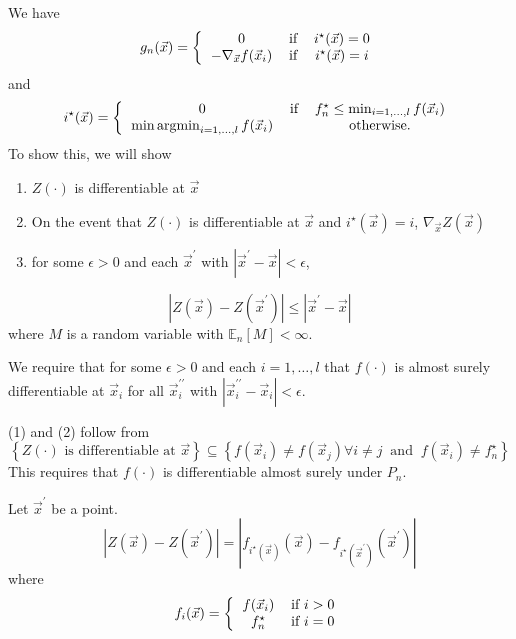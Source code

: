 \documentclass[phd,tocprelim]{cornell}
\DeclareMathOperator*{\argmin}{argmin}
\begin{document}
We have
\begin{equation}
    g_{n}(\vec{x}) = \left\{ \begin{tabular}{ccc}
        0 & if & $i^{\star}(\vec{x}) = 0$ \\
        $-\nabla_{\vec{x}} f(\vec{x}_{i})$ & if & $i^{\star}(\vec{x}) = i$
    \end{tabular} \right.
\end{equation}
and
\begin{equation}
    i^{\star}(\vec{x}) = \left\{ \begin{tabular}{ccc}
        0 & if & $f_{n}^{\star} \leq \min_{i=1,\ldots,l} f(\vec{x}_{i})$ \\
        $\min \argmin_{i=1,\ldots,l} f(\vec{x}_{i})$ & & otherwise.
    \end{tabular} \right.
\end{equation}
To show this, we will show
\begin{enumerate}
    \item $Z(\cdot)$ is differentiable at $\vec{x}$
    \item On the event that $Z(\cdot)$ is differentiable at $\vec{x}$ and $i^{\star}(\vec{x}) = i$, $\nabla_{\vec{x}} Z(\vec{x})$
    \item for some $\epsilon > 0$ and each $\vec{x}^{\prime}$ with $|\vec{x}^{\prime} - \vec{x}| < \epsilon$,
\end{enumerate}
\begin{equation}
    \left|Z(\vec{x}) - Z(\vec{x}^{\prime})\right| \leq \left|\vec{x}^{\prime} - \vec{x}\right|
\end{equation}
where $M$ is a random variable with $\mathbb{E}_{n}\left[M\right] < \infty$.

We require that for some $\epsilon > 0$ and each $i = 1, \ldots, l$ that $f(\cdot)$ is almost surely differentiable at $\vec{x}_{i}$ for all $\vec{x}_{i}^{\prime\prime}$ with $|\vec{x}_{i}^{\prime\prime} - \vec{x}_{i}| < \epsilon$.

(1) and (2) follow from
\begin{equation}
    \left\{Z(\cdot) \text{ is differentiable at } \vec{x}\right\} \subseteq \left\{f(\vec{x}_{i}) \neq f(\vec{x}_{j}) \forall i \neq j \ \text{ and } \ f(\vec{x}_{i}) \neq f_{n}^{\star} \right\}
\end{equation}
This requires that $f(\cdot)$ is differentiable almost surely under $P_{n}$.

Let $\vec{x}^{\prime}$ be a point.
\begin{equation}
    \left|Z(\vec{x}) - Z(\vec{x}^{\prime})\right| = \left|f_{i^{\star}(\vec{x})}(\vec{x}) - f_{i^{\star}(\vec{x}^{\prime})}(\vec{x}^{\prime})\right|
    \label{ZZ}
\end{equation}
where
\begin{equation}
    f_{i}(\vec{x}) = \left\{ \begin{tabular}{cc}
        $f(\vec{x}_{i})$ & if $i > 0$ \\
        $f_{n}^{\star}$ & if $i = 0$
    \end{tabular} \right.
\end{equation}
\end{document}
